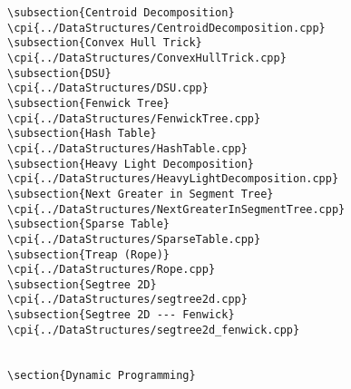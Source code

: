 {\begin{verbatim}
\subsection{Centroid Decomposition}
\cpi{../DataStructures/CentroidDecomposition.cpp}
\subsection{Convex Hull Trick}
\cpi{../DataStructures/ConvexHullTrick.cpp}
\subsection{DSU}
\cpi{../DataStructures/DSU.cpp}
\subsection{Fenwick Tree}
\cpi{../DataStructures/FenwickTree.cpp}
\subsection{Hash Table}
\cpi{../DataStructures/HashTable.cpp}
\subsection{Heavy Light Decomposition}
\cpi{../DataStructures/HeavyLightDecomposition.cpp}
\subsection{Next Greater in Segment Tree}
\cpi{../DataStructures/NextGreaterInSegmentTree.cpp}
\subsection{Sparse Table}
\cpi{../DataStructures/SparseTable.cpp}
\subsection{Treap (Rope)}
\cpi{../DataStructures/Rope.cpp}
\subsection{Segtree 2D}
\cpi{../DataStructures/segtree2d.cpp}
\subsection{Segtree 2D --- Fenwick}
\cpi{../DataStructures/segtree2d_fenwick.cpp}


\section{Dynamic Programming}


\end{verbatim}}
